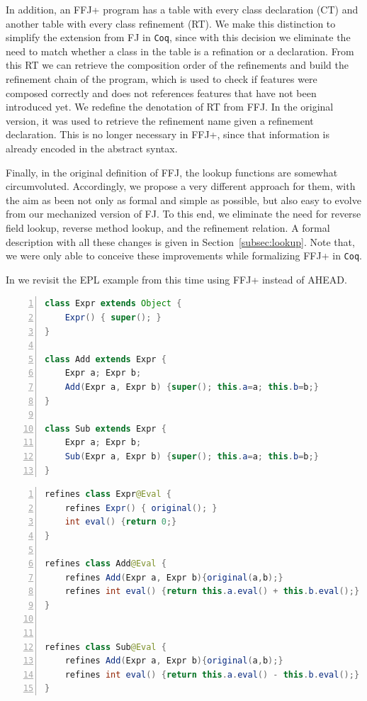 In addition, an \gls{FFJ+} program has a table with every class 
declaration (\textsf{CT}) and another table with every class refinement (\textsf{RT}).
We make this distinction to simplify the extension from \gls{FJ} in \texttt{Coq}, since 
with this decision we eliminate the need to match whether a class in the table 
is a refination or a declaration. From this \textsf{RT} we can retrieve the composition order
of the refinements and build the refinement chain of the program, 
which is used to check if features were composed correctly and
does not references features that have not been introduced yet. 
We redefine the denotation of \textsf{RT} from \gls{FFJ}.
In the original version, it was used to retrieve the refinement name given a 
refinement declaration. This is no longer necessary in \gls{FFJ+}, since
that information is already encoded in the abstract syntax.

Finally, in the original definition of \gls{FFJ}, the lookup functions are 
somewhat circumvoluted. Accordingly, we propose a very different approach
for them, with the aim as been not only as formal and simple as possible, 
but also easy to evolve from our mechanized version of \gls{FJ}. 
To this end, we eliminate the need for reverse field lookup, reverse method lookup, 
and the refinement relation. A formal description with all these changes 
is given in Section~\ref{subsec:lookup}. Note that, we were only 
able to conceive these improvements while formalizing \gls{FFJ+} in 
\texttt{Coq}. 

In  we revisit the EPL example from 
 this time using \gls{FFJ+} instead of AHEAD.

\begin{lstlisting}[language=Java, frame=single, numbers=left, basicstyle=\footnotesize,
    label={lst:expr-ct}, caption={EPL Class Table}, captionpos=b]
class Expr extends Object {
    Expr() { super(); }
}

class Add extends Expr {
    Expr a; Expr b;
    Add(Expr a, Expr b) {super(); this.a=a; this.b=b;}
}

class Sub extends Expr {
    Expr a; Expr b;
    Sub(Expr a, Expr b) {super(); this.a=a; this.b=b;}
}
\end{lstlisting}

\begin{lstlisting}[language=Java, frame=single, numbers=left, basicstyle=\footnotesize,
    label={lst:expr-rt}, caption={EPL Refinement Table}, captionpos=b]
refines class Expr@Eval {
    refines Expr() { original(); }
    int eval() {return 0;}
}

refines class Add@Eval {
    refines Add(Expr a, Expr b){original(a,b);}
    refines int eval() {return this.a.eval() + this.b.eval();}
}


refines class Sub@Eval {
    refines Add(Expr a, Expr b){original(a,b);}
    refines int eval() {return this.a.eval() - this.b.eval();}
}
\end{lstlisting}

